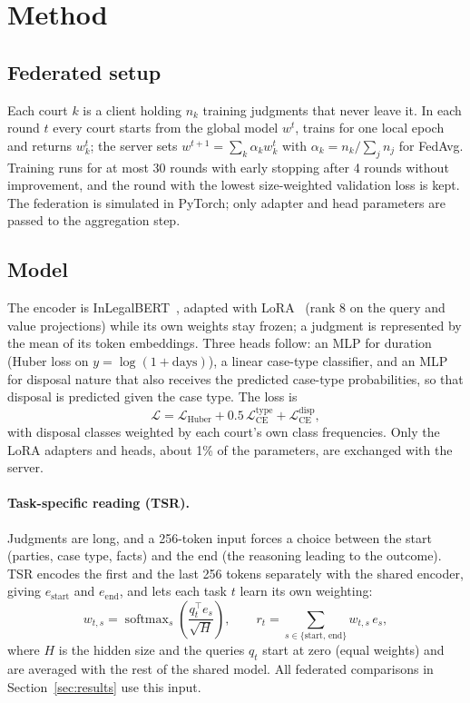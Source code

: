 \documentclass[11pt,a4paper]{article}
\begin{document}
\section{Method}
\subsection{Federated setup}
Each court $k$ is a client holding $n_k$ training judgments that never leave it. In each round $t$
every court starts from the global model $w^t$, trains for one local epoch and returns $w^t_k$; the
server sets $w^{t+1}=\sum_k \alpha_k w^t_k$ with $\alpha_k=n_k/\sum_j n_j$ for FedAvg. Training runs
for at most 30 rounds with early stopping after 4 rounds without improvement, and the round with the
lowest size-weighted validation loss is kept. The federation is simulated in PyTorch; only adapter and
head parameters are passed to the aggregation step.

\subsection{Model}
The encoder is InLegalBERT~\cite{paul2023inlegalbert}, adapted with LoRA~\cite{hu2022lora} (rank 8 on
the query and value projections) while its own weights stay frozen; a judgment is represented by the
mean of its token embeddings. Three heads follow: an MLP for duration (Huber loss on $y=\log(1+\text{days})$),
a linear case-type classifier, and an MLP for disposal nature that also receives the predicted
case-type probabilities, so that disposal is predicted given the case type. The loss is
\begin{equation}
\mathcal{L} = \mathcal{L}_{\text{Huber}} + 0.5\,\mathcal{L}^{\text{type}}_{\text{CE}} + \mathcal{L}^{\text{disp}}_{\text{CE}},
\end{equation}
with disposal classes weighted by each court's own class frequencies. Only the LoRA adapters and heads,
about 1\% of the parameters, are exchanged with the server.

\paragraph{Task-specific reading (TSR).} Judgments are long, and a 256-token input forces a choice
between the start (parties, case type, facts) and the end (the reasoning leading to the outcome). TSR
encodes the first and the last 256 tokens separately with the shared encoder, giving $e_{\text{start}}$
and $e_{\text{end}}$, and lets each task $t$ learn its own weighting:
\begin{equation}
w_{t,s} = \operatorname{softmax}_{s}\!\left(\frac{q_t^\top e_s}{\sqrt{H}}\right), \qquad
r_t = \sum_{s\in\{\text{start},\,\text{end}\}} w_{t,s}\, e_s ,
\end{equation}
where $H$ is the hidden size and the queries $q_t$ start at zero (equal weights) and are averaged with
the rest of the shared model. All federated comparisons in Section~\ref{sec:results} use this input.
\end{document}
